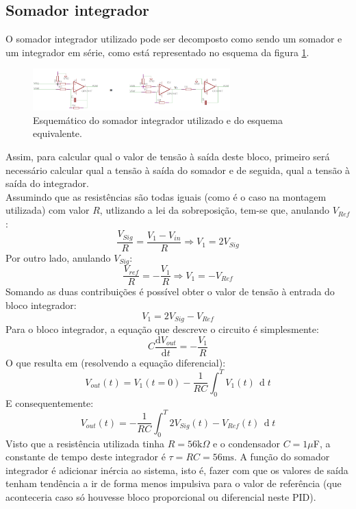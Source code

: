 \documentclass[%
  reprint,
  nofootinbib,
  amsmath,amssymb,
  aps,
  10pt,
  a4paper
]{revtex4-1}
\begin{document}
\subsection{Somador integrador}
O somador integrador utilizado pode ser decomposto como sendo um somador e um integrador em série, como está representado no esquema da figura \ref{fig:intg}.
\begin{figure}[h]
\includegraphics[width=3in]{../img/intg.png}
\caption{Esquemático do somador integrador utilizado e do esquema equivalente.}
\label{fig:intg}
\end{figure}
Assim, para calcular qual o valor de tensão à saída deste bloco, primeiro será necessário calcular qual a tensão à saída do somador e de seguida, qual a tensão à saída do integrador.\\
Assumindo que as resistências são todas iguais (como é o caso na montagem utilizada) com valor $R$, utlizando a lei da sobreposição, tem-se que, anulando $V_{Ref}$:
\begin{equation}
\frac{V_{Sig}}{R}=\frac{V_1-V_{in}}{R}\Rightarrow V_1=2V_{Sig}
\end{equation}
Por outro lado, anulando $V_{Sig}$:
\begin{equation}
\frac{V_{ref}}{R}=-\frac{V_1}{R}\Rightarrow V_{1}=-V_{Ref}
\end{equation}
Somando as duas contribuições é possível obter o valor de tensão à entrada do bloco integrador:
\begin{equation}
V_1=2V_{Sig}-V_{Ref}
\end{equation}
Para o bloco integrador, a equação que descreve o circuito é simplesmente:
\begin{equation}
C\frac{\mathrm{d}V_{out}}{\mathrm{d}t}=-\frac{V_1}{R}
\end{equation}
O que resulta em (resolvendo a equação diferencial):
\begin{equation}
V_{out}(t)=V_1(t=0)- \frac{ 1 }{RC} \int_{0}^{T}V_{\text{1}}(t)\, \operatorname{d}t
\end{equation}
E consequentemente:
\begin{equation}
V_{out}(t)=-\frac{ 1 }{RC} \int_{0}^{T}2V_{Sig}(t)-V_{Ref}(t)\, \operatorname{d}t
\end{equation}
Visto que a resistência utilizada tinha $R=56\mathrm{k}\Omega$ e o condensador $C=1\mu$F, a constante de tempo deste integrador é $\tau=RC=56\mathrm{ms}$.
A função do somador integrador é adicionar inércia ao sistema, isto é, fazer com que os valores de saída tenham tendência a ir de forma menos impulsiva para o valor de referência (que aconteceria caso só houvesse bloco proporcional ou diferencial neste PID).
\end{document}
